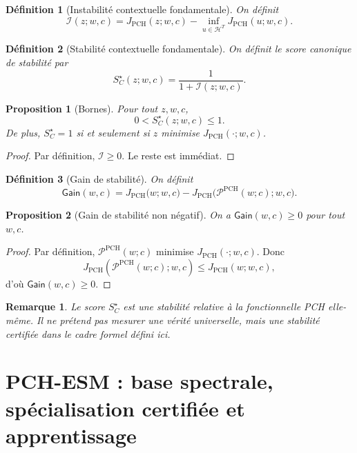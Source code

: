 \documentclass[11pt,a4paper]{article}
\newtheorem{definition}{Définition}[section]
\newtheorem{proposition}{Proposition}[section]
\newtheorem{remark}{Remarque}[section]
\newcommand{\Hh}{\mathcal H}
\newcommand{\Pcal}{\mathcal P}
\newcommand{\1}{\mathbf 1}
\begin{document}
\begin{definition}[Instabilité contextuelle fondamentale]
On définit
\[
\mathcal I(z;w,c)
=
J_{\mathrm{PCH}}(z;w,c)-\inf_{u\in\Hh^T}J_{\mathrm{PCH}}(u;w,c).
\]
\end{definition}

\begin{definition}[Stabilité contextuelle fondamentale]
On définit le score canonique de stabilité par
\[
S_C^\star(z;w,c)=\frac{1}{1+\mathcal I(z;w,c)}.
\]
\end{definition}

\begin{proposition}[Bornes]
Pour tout \(z,w,c\),
\[
0<S_C^\star(z;w,c)\le 1.
\]
De plus, \(S_C^\star=1\) si et seulement si \(z\) minimise \(J_{\mathrm{PCH}}(\cdot;w,c)\).
\end{proposition}

\begin{proof}
Par définition, \(\mathcal I\ge 0\).  
Le reste est immédiat.
\end{proof}

\begin{definition}[Gain de stabilité]
On définit
\[
\mathsf{Gain}(w,c)
=
J_{\mathrm{PCH}}\!\bigl(w;w,c\bigr)
-
J_{\mathrm{PCH}}\!\bigl(\Pcal^{\mathrm{PCH}}(w;c);w,c\bigr).
\]
\end{definition}

\begin{proposition}[Gain de stabilité non négatif]
On a \(\mathsf{Gain}(w,c)\ge 0\) pour tout \(w,c\).
\end{proposition}

\begin{proof}
Par définition, \(\Pcal^{\mathrm{PCH}}(w;c)\) minimise \(J_{\mathrm{PCH}}(\cdot;w,c)\).  
Donc
\[
J_{\mathrm{PCH}}(\Pcal^{\mathrm{PCH}}(w;c);w,c)\le J_{\mathrm{PCH}}(w;w,c),
\]
d'où \(\mathsf{Gain}(w,c)\ge 0\).
\end{proof}

\begin{remark}
Le score \(S_C^\star\) est une stabilité relative à la fonctionnelle PCH elle-même.  
Il ne prétend pas mesurer une vérité universelle, mais une stabilité certifiée dans le cadre formel défini ici.
\end{remark}

\section{PCH-ESM : base spectrale, spécialisation certifiée et apprentissage}
\end{document}
